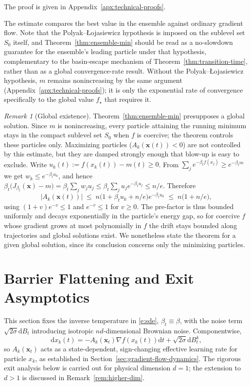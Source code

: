\documentclass{article}
\newcommand{\dd}{\mathrm d}
\theoremstyle{plain}
\theoremstyle{definition}
\theoremstyle{remark}
\newtheorem{remark}[theorem]{Remark}
\newcommand{\prefactor}[2]{A_{#1}(#2)}
\newcommand{\xx}{\mathbf{x}}
\begin{document}
\noindent The proof is given in Appendix~\ref{apx:technical-proofs}.

The estimate compares the best value in the ensemble against ordinary gradient flow. Note that the Polyak--\L{}ojasiewicz hypothesis is imposed on the sublevel set $S_0$ itself, and Theorem~\ref{thm:ensemble-min} should be read as a no-slowdown guarantee for the ensemble's leading particle under that hypothesis, complementary to the basin-escape mechanism of Theorem~\ref{thm:transition-time}, rather than as a global convergence-rate result. Without the Polyak--\L{}ojasiewicz hypothesis, $m$ remains nonincreasing by the same argument (Appendix~\ref{apx:technical-proofs}); it is only the exponential rate of convergence specifically to the global value $f_\star$ that requires it.

\begin{remark}[Global existence]
    \label{rem:global-existence}
    Theorem~\ref{thm:ensemble-min} presupposes a global solution. Since $m$ is nonincreasing, every particle attaining the running minimum stays in the compact sublevel set $S_0$ when $f$ is coercive; the theorem controls these particles only. Maximizing particles ($\prefactor{k}{\xx(t)}<0$) are not controlled by this estimate, but they are damped strongly enough that blow-up is easy to exclude. Write $u_k(t):=f(x_k(t))-m(t)\ge0$. From $\sum_je^{-\beta_tf(x_j)}\ge e^{-\beta_tm}$ we get $w_k\le e^{-\beta_tu_k}$, and hence $\beta_t\bigl(J_{\beta_t}(\xx)-m\bigr)=\beta_t\sum_jw_ju_j\le\beta_t\sum_ju_je^{-\beta_tu_j}\le n/e$. Therefore
    \[
        |\prefactor{k}{\xx(t)}|\;\le\; n\bigl(1+\beta_tu_k+n/e\bigr)e^{-\beta_tu_k}\;\le\;n\bigl(1+n/e\bigr),
    \]
    using $(1+v)e^{-v}\le1$ and $e^{-v}\le1$ for $v\ge0$. The pre-factor is thus bounded uniformly and decays exponentially in the particle's energy gap, so for coercive $f$ whose gradient grows at most polynomially in $f$ the drift stays bounded along trajectories and global solutions exist. We nonetheless state the theorem for a given global solution, since its conclusion concerns only the minimizing particles.
\end{remark}


\section{Barrier Flattening and Exit Asymptotics}
\label{sec:hitting-times}

This section fixes the inverse temperature in \eqref{e:sde}, $\beta_t\equiv\beta$, with the noise term $\sqrt{2\sigma}\dd B_t$ introducing isotropic $nd$-dimensional Brownian noise. Componentwise,
\begin{equation}
    \dd x_k(t) = -\prefactor{k}{\xx_t}\nabla f(x_k(t))\dd t + \sqrt{2\sigma}\dd B_t^k,
    \label{eq:softmin-langevin}
\end{equation}
so $\prefactor{k}{\xx_t}$ acts as a state-dependent, sign-changing effective learning rate for particle $x_k$, as established in Section~\ref{sec:gradient-flow-dynamics}. The rigorous exit analysis below is carried out for physical dimension $d=1$; the extension to $d>1$ is discussed in Remark~\ref{rem:higher-dim}.
\end{document}

